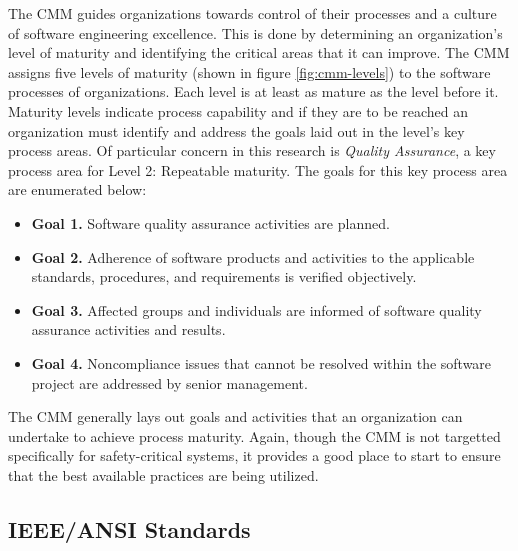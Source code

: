 The CMM guides organizations towards control of their processes and a culture of
software engineering excellence. This is done by determining an organization's
level of maturity and identifying the critical areas that it can improve. The
CMM assigns five levels of maturity (shown in figure \ref{fig:cmm-levels}) to
the software processes of organizations. Each level is at least as mature as the
level before it. Maturity levels indicate process capability and if they are to
be reached an organization must identify and address the goals laid out in the
level's key process areas. Of particular concern in this research is
\textit{Quality Assurance}, a key process area for Level 2: Repeatable maturity.
The goals for this key process area are enumerated below: \singlespace
\begin{itemize}
  \item \textbf{Goal 1.} Software quality assurance activities are planned.
  \item \textbf{Goal 2.} Adherence of software products and activities to the
        applicable standards, procedures, and requirements is verified
        objectively.
  \item \textbf{Goal 3.} Affected groups and individuals are informed of
        software quality assurance activities and results.
  \item \textbf{Goal 4.} Noncompliance issues that cannot be resolved within
        the software project are addressed by senior management.
\end{itemize}
\doublespace
The CMM generally lays out goals and activities that an organization can
undertake to achieve process maturity. Again, though the CMM is not targetted
specifically for safety-critical systems, it provides a good place to start to
ensure that the best available practices are being utilized.

\subsection{IEEE/ANSI Standards}

